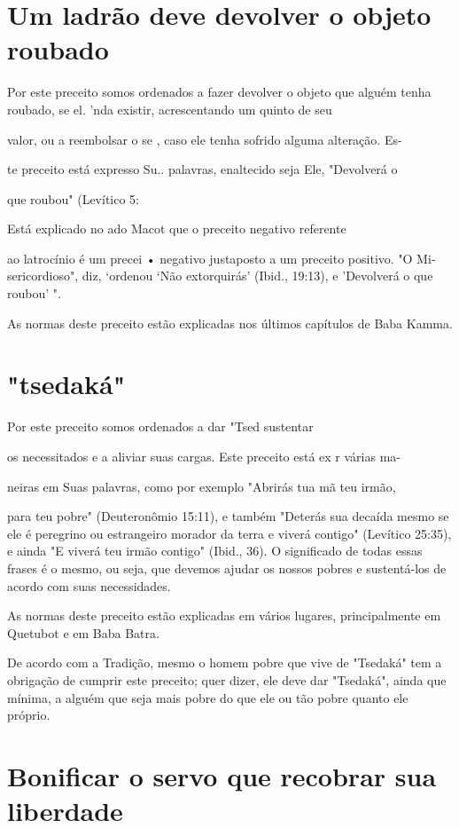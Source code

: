 \begin{itemize}
\begin{enumrate}
\begin{itemize}
\begin{itemize}
\begin{itemize}
\section{Um ladrão deve devolver o objeto roubado}

Por este preceito somos ordenados a fazer devolver o objeto que alguém
tenha roubado, se el. 'nda existir, acrescentando um
quinto de seu

valor, ou a reembolsar o se , caso ele tenha sofrido alguma alteração.
Es-

te preceito está expresso Su.. palavras, enaltecido seja Ele, "Devolverá
o

que roubou" (Levítico 5:

Está explicado no ado Macot que o preceito negativo referente

ao latrocínio é um precei • negativo justaposto a um preceito positivo.
"O Mi­sericordioso", diz, `ordenou `Não extorquirás' (Ibid., 19:13), e
'Devolverá o que roubou' ".

As normas deste preceito estão explicadas nos últimos capítulos de Baba
Kamma.

\section{"tsedaká"}

Por este preceito somos ordenados a dar "Tsed sustentar

os necessitados e a aliviar suas cargas. Este preceito está ex r várias
ma-

neiras em Suas palavras, como por exemplo "Abrirás tua mã teu irmão,

para teu pobre" (Deuteronômio 15:11), e também "Deterás sua decaída
mes­mo se ele é peregrino ou estrangeiro morador da terra e viverá
contigo" (Leví­tico 25:35), e ainda "E viverá teu irmão contigo" (Ibid.,
36). O significado de todas essas frases é o mesmo, ou seja, que devemos
ajudar os nossos pobres e sustentá-los de acordo com suas necessidades.

As normas deste preceito estão explicadas em vários lugares,
princi­palmente em Quetubot e em Baba Batra.

De acordo com a Tradição, mesmo o homem pobre que vive de "Tse­daká" tem
a obrigação de cumprir este preceito; quer dizer, ele deve dar
"Tse­daká", ainda que mínima, a alguém que seja mais pobre do que ele ou
tão po­bre quanto ele próprio.

\section{Bonificar o servo que recobrar sua liberdade}


\end{itemize}
\end{itemize}
\end{itemize}
\end{enumrate}
\end{itemize}
